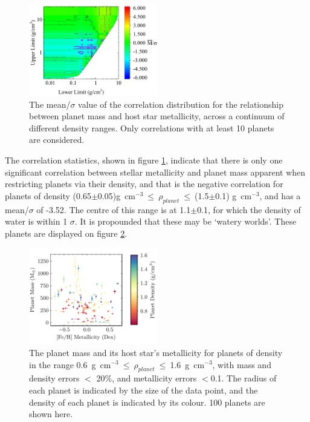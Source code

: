 \documentclass[a4paper,twocolumn,12pt]{article}
\begin{document}
\begin{figure}[h!]
    \centering
    \includegraphics[width=0.5\textwidth]{Graphs/FeH vs Mass correlations - Density ranges.pdf}
    \caption{The mean/$\sigma$ value of the correlation distribution for the relationship between planet mass and host star metallicity, across a continuum of different density ranges. Only correlations with at least 10 planets are considered.}
    \label{figure: Fe/H vs Mass correlations - Density ranges}
\end{figure}

The correlation statistics, shown in figure \ref{figure: Fe/H vs Mass correlations - Density ranges}, indicate that there is only one significant correlation between stellar metallicity and planet mass apparent when restricting planets via their density, and that is the negative correlation for planets of density (0.65$\pm$0.05)g~cm$^{-3}~\leq~\rho_{planet}~\leq~$(1.5$\pm$0.1) g~cm$^{-3}$, and has a mean/$\sigma$ of -3.52. The centre of this range is at 1.1$\pm$0.1, for which the density of water is within 1 $\sigma$. It is propounded that these may be `watery worlds'. These planets are displayed on figure \ref{figure: Fe/H vs Mass correlations - Planet Plot Density 0.6 to 1.6}.

\begin{figure}[h!]
    \centering
    \includegraphics[width=0.5\textwidth]{Graphs/FeH vs Mass Planet Plot Density 0.6 to 1.6.pdf}
    \caption{The planet mass and its host star's metallicity for planets of density in the range 0.6~g~cm$^{-3}~\leq~\rho_{planet}~\leq~$1.6~g~cm$^{-3}$, with mass and density errors $<$ 20\%, and metallicity errors $<$0.1. The radius of each planet is indicated by the size of the data point, and the density of each planet is indicated by its colour. 100 planets are shown here.}
    \label{figure: Fe/H vs Mass correlations - Planet Plot Density 0.6 to 1.6}
\end{figure}
\end{document}
